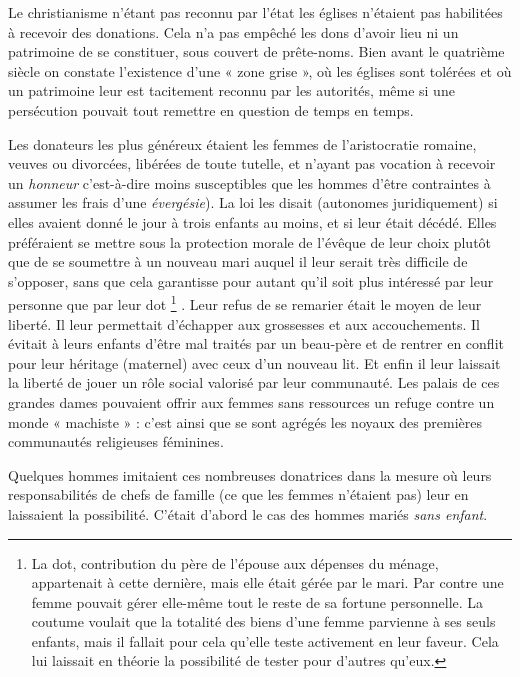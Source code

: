  Le christianisme n'étant pas reconnu par l'état les églises n'étaient pas habilitées à recevoir des donations. Cela n'a pas empêché les dons d'avoir lieu ni un patrimoine de se constituer, sous couvert de prête-noms. Bien avant le quatrième siècle on constate l'existence d'une « zone grise », où les églises sont tolérées et où un patrimoine leur est tacitement reconnu par les autorités, même si une persécution pouvait tout remettre en question de temps en temps. 

 Les donateurs les plus généreux étaient les femmes de l'aristocratie romaine, veuves ou divorcées, libérées de toute tutelle, et n'ayant pas vocation à recevoir un \emph{honneur} c'est-à-dire moins susceptibles que les hommes d'être contraintes à assumer les frais d'une \emph{évergésie}). La loi les disait  (autonomes juridiquement) si elles avaient donné le jour à trois enfants au moins, et si leur  était décédé. Elles préféraient se mettre sous la protection morale de l'évêque de leur choix plutôt que de se soumettre à un nouveau mari auquel il leur serait très difficile de s'opposer, sans que cela garantisse pour autant qu'il soit plus intéressé par leur personne que par leur dot
\footnote{La dot, contribution du père de l'épouse aux dépenses du ménage, appartenait à cette dernière, mais elle était gérée par le mari. Par contre une femme  pouvait gérer elle-même tout le reste de sa fortune personnelle. La coutume voulait que la totalité des biens d'une femme parvienne à ses seuls enfants, mais il fallait pour cela qu'elle teste activement en leur faveur. Cela lui laissait en théorie la possibilité de tester pour d'autres qu'eux.}%
. Leur refus de se remarier était le moyen de leur liberté. Il leur permettait d'échapper aux grossesses et aux accouchements. Il évitait à leurs enfants d'être mal traités par un beau-père et de rentrer en conflit pour leur héritage (maternel) avec ceux d'un nouveau lit. Et enfin il leur laissait la liberté de jouer un rôle social valorisé par leur communauté. Les palais de ces grandes dames pouvaient offrir aux femmes sans ressources un refuge contre un monde « machiste » : c'est ainsi que se sont agrégés les noyaux des premières communautés religieuses féminines. 

 Quelques hommes imitaient ces nombreuses donatrices dans la mesure où leurs responsabilités de chefs de famille (ce que les femmes n'étaient pas) leur en laissaient la possibilité. C'était d'abord le cas des hommes mariés \emph{sans enfant}.

